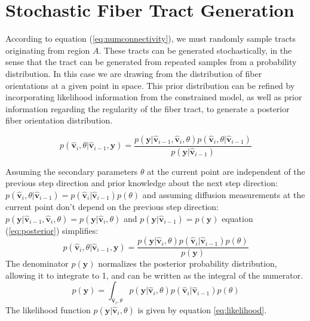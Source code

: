 \section{Stochastic Fiber Tract Generation}
According to equation (\ref{eq:numconnectivity}), we must randomly sample tracts originating from region $A$.  These tracts can be generated stochastically, in the sense that the tract can be generated from repeated samples from a probability distribution.  In this case we are drawing from the distribution of fiber orientations at a given point in space.  This prior distribution can be refined by incorporating likelihood information from the constrained model, as well as prior information regarding the regularity of the fiber tract, to generate a posterior fiber orientation distribution.

\begin{equation} \label{eq:posterior}
p({\mathbf{\hat{v}}_i, \theta | \mathbf{\hat{v}}_{i-1}, \mathbf{y}}) =
\frac {p(\mathbf{y}| \mathbf{\hat{v}}_{i-1}, \mathbf{\hat{v}}_i, \theta) p(\mathbf{\hat{v}}_i, \theta | \mathbf{\hat{v}}_{i-1})}
{p(\mathbf{y}|\mathbf{\hat{v}}_{i-1})}
\end{equation}

Assuming the secondary parameters $\theta$ at the current point are independent of the previous step direction and prior knowledge about the next step direction: $p(\mathbf{\hat{v}}_i, \theta | \mathbf{\hat{v}}_{i-1}) = p(\mathbf{\hat{v}}_i | \mathbf{\hat{v}}_{i-1})p(\theta)$ and assuming diffusion measurements at the current point don't depend on the previous step direction: $p(\mathbf{y}| \mathbf{\hat{v}}_{i-1}, \mathbf{\hat{v}}_i, \theta) = p(\mathbf{y}| \mathbf{\hat{v}}_i, \theta)$ and $p(\mathbf{y}|\mathbf{\hat{v}}_{i-1}) = p(\mathbf{y})$ equation (\ref{eq:posterior}) simplifies:
%
%
\begin{equation} \label{eq:posteriorsimp}
p({\mathbf{\hat{v}}_i, \theta | \mathbf{\hat{v}}_{i-1}, \mathbf{y}}) =
\frac {p(\mathbf{y}| \mathbf{\hat{v}}_i, \theta) p(\mathbf{\hat{v}}_i | \mathbf{\hat{v}}_{i-1}) p(\theta)}
{p(\mathbf{y})}
\end{equation}
%
%
The denominator $p(\mathbf{y})$ normalizes the posterior probability distribution, allowing it to integrate to 1, and can be written as the integral of the numerator.
%
%
\begin{equation} \label{eq:normalization}
p(\mathbf{y}) = \int_{\mathbf{\hat{v}}_i, \theta} p(\mathbf{y}| \mathbf{\hat{v}}_i, \theta) p(\mathbf{\hat{v}}_i | \mathbf{\hat{v}}_{i-1}) p(\theta)
\end{equation}
%
%
The likelihood function $p(\mathbf{y}| \mathbf{\hat{v}}_i, \theta)$ is given by equation \ref{eq:likelihood}.

